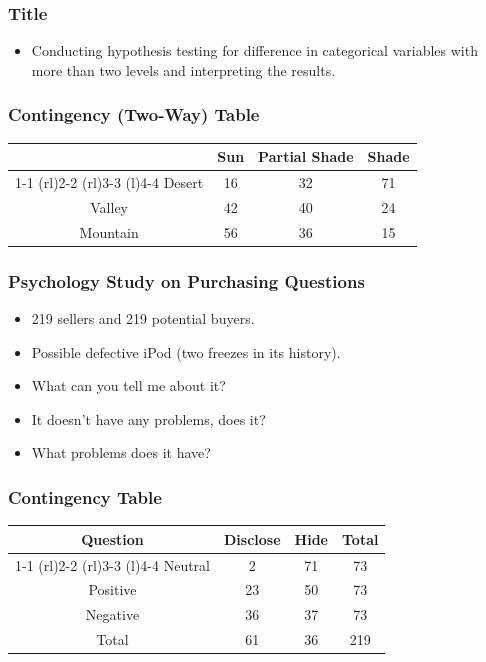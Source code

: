 \documentclass{beamer}
\begin{document}
\begin{frame}
  \frametitle{Title}
  \begin{itemize}
    \item[] 
    Conducting hypothesis testing for difference in categorical
    variables with more than two levels and interpreting the results. 
  \end{itemize}
\end{frame}

\begin{frame}
  \frametitle{Contingency (Two-Way) Table}
  \begin{table}
    \begin{tabular}{@{}cccc@{}}
      \toprule
      & Sun & Partial Shade & Shade \\
      \cmidrule(r){1-1} \cmidrule(rl){2-2} \cmidrule(rl){3-3}
      \cmidrule(l){4-4}
      Desert & 16 & 32 & 71 \\[0.3em]
      Valley & 42 & 40 & 24 \\[0.3em]
      Mountain & 56 & 36 & 15 \\
      \bottomrule
    \end{tabular}
  \end{table}
\end{frame}

\begin{frame}
  \frametitle{Psychology Study on Purchasing Questions}
  \begin{itemize}
    \item[] 
      219 sellers and 219 potential buyers.
      \vspace{0.5cm}
    \item[] 
      Possible defective iPod (two freezes in its history). 
      \vspace{0.5cm}
    \item[] 
      What can you tell me about it?
      \vspace{0.5cm}
    \item[] 
      It doesn't have any problems, does it?
      \vspace{0.5cm}
    \item[] 
      What problems does it have?
  \end{itemize}
\end{frame}

\begin{frame}
  \frametitle{Contingency Table}
  \begin{table}
    \begin{tabular}{@{}cccc@{}}
      \toprule
      Question & Disclose & Hide & Total \\
      \cmidrule(r){1-1} \cmidrule(rl){2-2} \cmidrule(rl){3-3}
      \cmidrule(l){4-4}
      Neutral & 2 & 71 & 73 \\[0.3em]
      Positive & 23 & 50 & 73 \\[0.3em]
      Negative & 36 & 37 & 73 \\
      Total & 61 & 36 & 219 \\
      \bottomrule
    \end{tabular}
  \end{table}
\end{frame}
\end{document}
